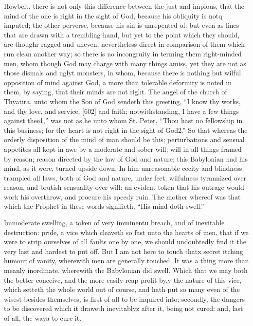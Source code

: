 Howbeit, there is not only this difference between the just and impious, that the mind of the one is right in the sight of God, because his obliquity is notq imputed; the other perverse, because his sin is unrepented of: but even as lines that are drawn with a trembling hand, but yet to the point which they should, are thoughr ragged and uneven, nevertheless direct in comparison of them which run clean another way; so there is no incongruity in terming them right-minded men, whom though God may charge with many things amiss, yet they are not as those dismals and uglyt monsters, in whom, because there is nothing but wilful opposition of mind against God, a more than tolerable deformity is noted in them, by saying, that their minds are not right. The angel of the church of Thyatira, unto whom the Son of God sendeth this greeting, “I know thy works, and thy love, and service, [602] and faith; notwithstanding, I have a few things against thee1,” was not as he unto whom St. Peter, “Thou hast no fellowship in this business; for thy heart is not right in the sight of God2.” So that whereas the orderly disposition of the mind of man should be this; perturbations and sensual appetites all kept in awe by a moderate and sober will; will in all things framed by reason; reason directed by the law of God and nature; this Babylonian had his mind, as it were, turned upside down. In him unreasonable cecity and blindness trampled all laws, both of God and nature, under feet; wilfulness tyrannized over reason, and brutish sensuality over will: an evident token that his outrage would work his overthrow, and procure his speedy ruin. The mother whereof was that which the Prophet in these words signifieth, “His mind doth swell.”

Immoderate swelling, a token of very imminentu breach, and of inevitable destruction: pride, a vice which cleaveth so fast unto the hearts of men, that if we were to strip ourselves of all faults one by one, we should undoubtedly find it the very last and hardest to put off. But I am not here to touch thatx secret itching humour of vanity, wherewith men are generally touched. It was a thing more than meanly inordinate, wherewith the Babylonian did swell. Which that we may both the better conceive, and the more easily reap profit by,y the nature of this vice, which setteth the whole world out of course, and hath put so many even of the wisest besides themselves, is first of all to be inquired into: secondly, the dangers to be discovered which it draweth inevitablyz after it, being not cured: and, last of all, the waya to cure it.

